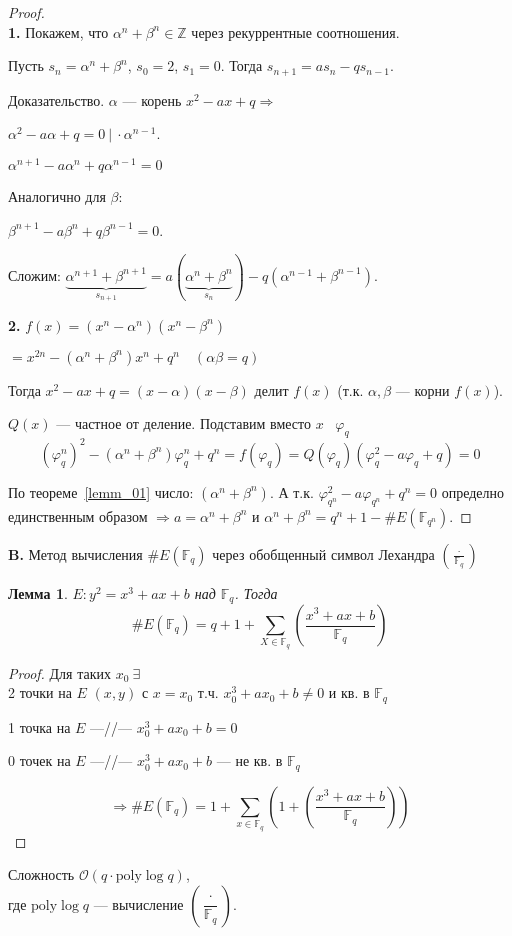 \documentclass[12pt]{article}
\newcommand{\Z}{{{\mathbb Z}}}
\newcommand{\F}{{{\mathbb F}}}
\newcommand{\bigO}{\mathcal{O}}
\newtheorem{lemma}[theorem]{Лемма}
\theoremstyle{definition}
\theoremstyle{definition}
\theoremstyle{definition}
\begin{document}
\begin{proof}
$ $\\
\textbf{1. } Покажем, что ${\alpha^n} + {\beta ^n} \in \Z$ через рекуррентные соотношения.

Пусть ${s_n} = {\alpha ^n} + {\beta ^n}$, ${s_0} = 2$, ${s_1} = 0$. Тогда $s_{n + 1} = a{s_n} - qs_{n - 1}.$

Доказательство. $\alpha $ — корень $x^2 - ax + q \Rightarrow $

${\alpha ^2} - a \alpha + q = 0 \ |\ \cdot {\alpha^{n - 1}}$. 

${\alpha ^{n + 1}} - a{\alpha ^n} + q{\alpha ^{n - 1}} = 0$

Аналогично для $\beta $: 

${\beta ^{n+1}} - a {\beta ^n} + q{\beta ^{n - 1}} = 0$. 

Сложим: $\underbrace {{\alpha ^{n + 1}} + \beta ^{n + 1}}_{s_{n + 1}} = a ( {\underbrace {{\alpha^n} + {\beta ^n}}_{{s_n}}} ) - q( {{\alpha ^{n - 1}} + {\beta ^{n - 1}}} ).$

\textbf{2.} $f( x ) = ( {{x^n} - {\alpha^n}} ){( {{x^n} - {\beta ^n}} )}$

$ = {x^{2n}} - ( \alpha^n + \beta^n ){x^n} + {q^n}\quad ( \alpha\beta  = q )$

Тогда ${x^2} - ax + q = ( {x - \alpha } )( {x - \beta } )$ делит $f( x )$ (т.к. $\alpha, \beta $ — корни $f(x)$). 

$Q( x )$ — частное от деление. Подставим вместо $x$ \ $\varphi_q$
$$
( {\varphi _q^n} )^2 - ( {{\alpha^n} + {\beta ^n}} )\varphi _q^n + {q^n} = f( {{\varphi_q}} ) = Q( {{\varphi _q}} )( {\varphi _q^2 - a{\varphi _q} + q} ) = 0
$$

По теореме~\ref{lemm_01} число: $(\alpha^n + \beta^n )$. А т.к. $\varphi _{{q^n}}^2 - {a\varphi _{q^n}} + {q^n} = 0$  определно единственным образом $ \Rightarrow a = {\alpha ^n} + {\beta ^n}$ и ${\alpha ^n} + {\beta ^n} = {q^n} + 1 - \# E( {{\F_{q^n}}} )$. 
\end{proof}

\textbf{B.} Метод вычисления $\# E( \F_q )$ через обобщенный символ Лехандра $\left( {\frac{ \cdot }{{{\F_q}}}} \right)$

\begin{lemma}
	\label{lemm_03}
	$E:{y^2} = {x^3} + ax + b$ над ${\F_q}$. Тогда
	$$
	\# E( \F_q ) = q + 1 + \sum\limits_{X \in {\F_q}} {\left( {\frac{{{x^3} + ax + b}}{{{\F_q}}}} \right)} 
	$$
\end{lemma}

\begin{proof}Для таких $x_0\ \exists $ \\
2 точки на $E$ $( {x,y} )$ с $x = {x_0}$ т.ч. $x_0^3 + a{x_0} + b \ne 0$ и кв. в ${\F_q}$

1 точка на $E$ —//— $x_0^3 + a{x_0} + b = 0$

$0$ точек на $E$ —//— $x_0^3 + a{x_0} + b$ — не кв. в ${\F_q}$

$$
\Rightarrow \# E( \F_q ) = 1 + \sum\limits_{x \in {\F_q}} {\left( {1 + \left( {\frac{{x^3} + ax + b}{\F_q}} \right)} \right)}
$$
\end{proof}

Сложность $\bigO( {q \cdot {\text{poly}} \log q} )$, \\
где ${\text{poly}} \log q$ — вычисление $\left( {\dfrac{ \cdot }{\F_q}} \right)$.
\end{document}
